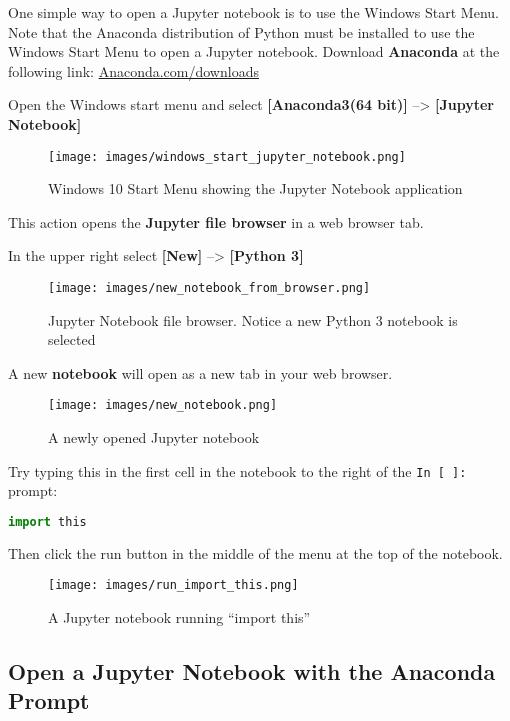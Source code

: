 \documentclass{book}
\makeatletter
\def\maxwidth{\ifdim\Gin@nat@width>\linewidth\linewidth
\else\Gin@nat@width\fi}
\let\Oldincludegraphics\includegraphics
\renewcommand{\includegraphics}[1]{\Oldincludegraphics[width=.8\maxwidth]{#1}}
\newcommand{\passthrough}[1]{#1}
\makeatother
\begin{document}
    
        One simple way to open a Jupyter notebook is to use the Windows Start
Menu. Note that the Anaconda distribution of Python must be installed to
use the Windows Start Menu to open a Jupyter notebook. Download
\textbf{Anaconda} at the following link:
\href{https://www.anaconda.com/download/}{Anaconda.com/downloads}

Open the Windows start menu and select \textbf{{[}Anaconda3(64 bit){]}}
--\textgreater{} \textbf{{[}Jupyter Notebook{]}}

\begin{figure}
\centering
\texttt{[image: images/windows\_start\_jupyter\_notebook.png]}
\caption{Windows 10 Start Menu showing the Jupyter Notebook application}
\end{figure}

This action opens the \textbf{Jupyter file browser} in a web browser
tab.

In the upper right select \textbf{{[}New{]}} --\textgreater{}
\textbf{{[}Python 3{]}}

\begin{figure}
\centering
\texttt{[image: images/new\_notebook\_from\_browser.png]}
\caption{Jupyter Notebook file browser. Notice a new Python 3 notebook
is selected}
\end{figure}

A new \textbf{notebook} will open as a new tab in your web browser.

\begin{figure}
\centering
\texttt{[image: images/new\_notebook.png]}
\caption{A newly opened Jupyter notebook}
\end{figure}

Try typing this in the first cell in the notebook to the right of the
\passthrough{\lstinline!In [ ]:!} prompt:

\begin{lstlisting}[language=Python]
import this
\end{lstlisting}

Then click the run button in the middle of the menu at the top of the
notebook.

\begin{figure}
\centering
\texttt{[image: images/run\_import\_this.png]}
\caption{A Jupyter notebook running ``import this''}
\end{figure}
    




    
        \hypertarget{open-a-jupyter-notebook-with-the-anaconda-prompt}{%
\subsection{Open a Jupyter Notebook with the Anaconda
Prompt}\label{open-a-jupyter-notebook-with-the-anaconda-prompt}}
    
\end{document}
